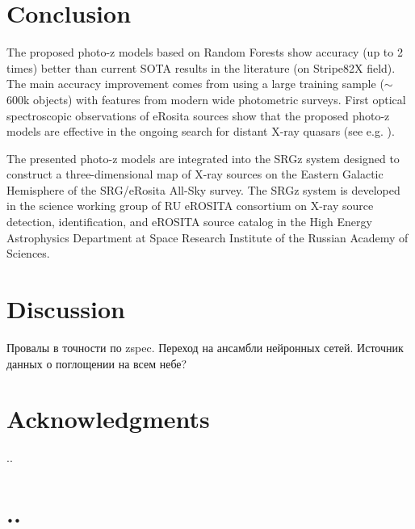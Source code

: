 \documentclass[fleqn,usenatbib]{mnras}
\begin{document}
\section{Conclusion}



The proposed photo-z models based on Random Forests show accuracy (up to 2 times) better than current SOTA results in the literature (on Stripe82X field). The main accuracy improvement comes from using a large training sample ($\sim$600k objects) with features from modern wide photometric surveys. First optical spectroscopic observations of eRosita sources show that the proposed photo-z models are effective in the ongoing search for distant X-ray quasars (see e.g. \citep{2020MNRAS.497.1842M,2020AstL...46..149K,2020AstL...46..429D}).

The presented photo-z models are integrated into the SRGz system designed to construct a three-dimensional map of X-ray sources on the Eastern Galactic Hemisphere of the SRG/eRosita All-Sky survey. The SRGz system is developed in the science working group of RU eROSITA consortium on X-ray source detection, identification, and eROSITA source catalog in the High Energy Astrophysics Department at Space Research Institute of the Russian Academy of Sciences.


\section{Discussion}

Провалы в точности по zspec. Переход на ансамбли нейронных сетей. Источник данных о поглощении на всем небе?

\section*{Acknowledgments}
..




\appendix

\section{..}
\end{document}
